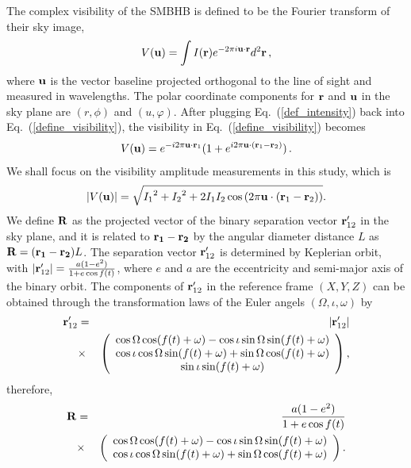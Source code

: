 \documentclass[twocolumn]{aastex62}
\def\m{\begin{eqnarray}}
\def\n{\end{eqnarray}}
\begin{document}
The complex visibility of the  SMBHB is defined to be the Fourier transform of their sky image, 
\m \label{define_visibility}
V({\bf u})=\int I({\bf r}) e^{- 2 \pi i {\bf u} \cdot {\bf r}}d^2 {\bf r}\,,
\n
where ${\bf u}$ is the vector baseline projected orthogonal to the line of sight and measured in wavelengths. 
The polar coordinate components for ${\bf r}$ and ${\bf u}$ in the sky plane are $(r, \phi)$ and $(u, \varphi)$. 
After plugging Eq.~(\ref{def_intensity}) back into Eq.~(\ref{define_visibility}), the visibility in Eq.~(\ref{define_visibility}) becomes
\m 
V({{\bf u}})=e^{-i 2 \pi {\bf u} \cdot {\bf r}_1}(1+ e^{i 2 \pi {\bf u} \cdot ({\bf r}_1-{\bf r}_2)}) \,.
\n
We shall focus on the visibility amplitude measurements in this study, which is
\m \label{abs_visibility}
|V({{\bf u}})|=\sqrt{ {I_1}^2+{I_2}^2+2 I_1 I_2 \cos{(2 \pi {\bf u}\cdot({\bf r}_1-{\bf r}_2))} }. 
\n
%
We define ${\bf R}$ as the projected vector of the binary separation vector ${\bf r}^{\prime}_{12}$ in the sky plane, and it is related to ${\bf r_1}-{\bf r_2}$ by the angular diameter distance $L$ as ${\bf R}=({\bf r_1}-{\bf r_2})L$. 
The separation vector ${\bf r}^{\prime}_{12}$ is determined by Keplerian orbit, with $|{\bf r}^{\prime}_{12}|={a (1-e^2)\over 1+e \cos f(t)}$, where $e$ and $a$ are the eccentricity and  semi-major axis of the binary orbit. The components of ${\bf r}^{\prime}_{12}$ in the reference frame $(X,Y,Z)$ can be obtained through the transformation laws of the Euler angels $(\Omega, \iota, \omega)$ by
\m 
{\bf r}^{\prime}_{12}&=&|{\bf r}^{\prime}_{12}|    \nonumber\\
&\times&
\left(
\begin{array}{c}
    \cos \Omega \cos (f(t)+\omega )-\cos \iota \sin \Omega \sin (f(t)+\omega ) \\
     \cos \iota \cos \Omega \sin (f(t)+\omega )+\sin \Omega \cos (f(t)+\omega ) \\
     \sin \iota \sin (f(t)+\omega ) \\
\end{array}
\right) ,   \nonumber\\
\n
therefore, 
\m \label{def_R}
{\bf R}&=&{a(1-e^2) \over 1+e \cos f(t)} \nonumber\\
&\times &
\left(
\begin{array}{c}
    \cos \Omega \cos (f(t)+\omega ) -\cos \iota \sin \Omega \sin (f(t)+\omega ) \\
     \cos \iota \cos \Omega \sin (f(t)+\omega )+\sin \Omega \cos (f(t)+\omega ) \\
\end{array}
\right) . \nonumber\\
\n
\end{document}
